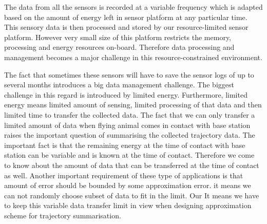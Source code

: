 \documentclass[conference]{IEEEtran}
\begin{document}
 The data from all the sensors is recorded at a variable frequency which is adapted based on 
 the amount of energy left in sensor platform at any particular time. This sensory data is then 
 processed and stored by our resource-limited sensor platform. However very small size of this 
 platform restricts the memory, processing and energy resources on-board. Therefore data 
 processing and management becomes a major challenge in this resource-constrained environment. 

The fact that sometimes these sensors will have to save the sensor logs of up to several months
introduces a big data management challenge. The biggest challenge in this regard is introduced 
by limited energy. Furthermore, limited energy means limited amount of sensing, limited processing 
of that data and then limited time to transfer the collected data. The fact that we can only 
transfer a limited amount of data when flying animal comes in contact with base station raises the 
important question of summarising the collected trajectory data. The important fact is that the 
remaining energy at the time of contact with base station can be variable and is known at the time 
of contact. Therefore we come to know about the amount of data that can be transferred at the time of 
contact as well. Another important requirement of these type of applications is that amount of error 
should be bounded by some approximation error. it means we can not randomly choose subset of data 
to fit in the limit. Our It means we have to keep this variable data transfer limit in view when 
designing approximation scheme for trajectory summarisation.

\end{document}
